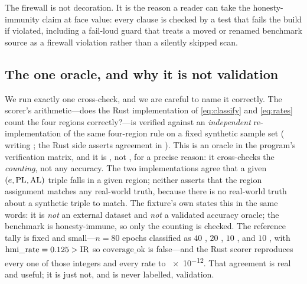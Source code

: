The firewall is not decoration. It is the reason a reader can take the
honesty-immunity claim at face value: every clause is checked by a test that fails
the build if violated, including a fail-loud guard that treats a moved or renamed
benchmark source as a firewall violation rather than a silently skipped scan.

\subsection{The one oracle, and why it is not validation}
\label{sec:oracle}

We run exactly one cross-check, and we are careful to name it correctly. The
scorer's arithmetic---does the Rust implementation of \eqref{eq:classify} and
\eqref{eq:rates} count the four regions correctly?---is verified against an
\emph{independent}  re-implementation of the same four-region rule on a
fixed synthetic sample set ( writing
; the Rust side asserts agreement in
). This is an 
oracle in the program's verification matrix, and it is \Modelled{}, not
\Validated{}, for a precise reason: it cross-checks the \emph{counting}, not any
accuracy. The two implementations agree that a given $(e,\mathrm{PL},\mathrm{AL})$ triple falls in
a given region; neither asserts that the region assignment matches any real-world
truth, because there is no real-world truth about a synthetic triple to match. The
fixture's own  states this in the same words: it is \emph{not} an
external dataset and \emph{not} a validated accuracy oracle; the benchmark is
honesty-immune, so only the counting is checked. The reference tally is fixed and
small---$n=80$ epochs classified as $40$ \Nominal{}, $20$ \MI{}, $10$ \HMI{}, and
$10$ \Unavail{}, with $\mathrm{hmi\_rate}=0.125>\mathrm{IR}$ so $\mathrm{coverage\_ok}$ is
false---and the Rust scorer reproduces every one of those integers and every rate
to \num{e-12}. That agreement is real and useful; it is just not, and is never
labelled, validation.
